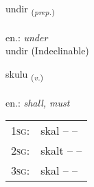 \documentclass[frontgrid, backgrid]{flacards}\usepackage[]{graphicx}\usepackage[]{xcolor}
\begin{document}
\renewcommand{\blhead}{\vskip5pt {\small\bfseries\footnotesize Forsetning | Preposition }}
\renewcommand{\bcfoot}{\vskip5pt \hspace{2pt}{\small\bfseries\footnotesize 1K}}


{undir \small{\textsubscript{(\textit{prep.})}} \\[1ex]
\textphonetic{[ʏntɪr]} \\
en.: \emph{under} \\  [2ex]
undir (Indeclinable)}

\renewcommand{\flhead}{\vskip5pt \fboxsep=0pt {\small\bfseries\footnotesize Sagnorð | Verb}}
\renewcommand{\fcfoot}{\vskip5pt \fboxsep=0pt \hspace{2pt}{\small\bfseries\footnotesize 1K}}

\renewcommand{\blhead}{\vskip5pt {\small\bfseries\footnotesize Sagnorð | Verb }}
\renewcommand{\bcfoot}{\vskip5pt \hspace{2pt}{\small\bfseries\footnotesize 1K}}


{skulu \small{\textsubscript{(\textit{v.})}} \\[1ex] %
\textphonetic{[skʏːlʏ]} \\
en.: \emph{shall, must} \\  [2ex]
\renewcommand*{\arraystretch}{0.8}
\begin{tabular}{p{1cm}l}
\textsc{1sg}: & skal --  --  \\ 
\textsc{2sg}: & skalt --  --  \\ 
\textsc{3sg}: & skal --  --  \\ 
\end{tabular}
}


\renewcommand{\flhead}{\vskip5pt \fboxsep=0pt {\small\bfseries\footnotesize Forsetning | Preposition}}
\renewcommand{\fcfoot}{\vskip5pt \fboxsep=0pt \hspace{2pt}{\small\bfseries\footnotesize 1K}}

\renewcommand{\blhead}{\vskip5pt {\small\bfseries\footnotesize Forsetning | Preposition }}
\renewcommand{\bcfoot}{\vskip5pt \hspace{2pt}{\small\bfseries\footnotesize 1K}}
\end{document}
